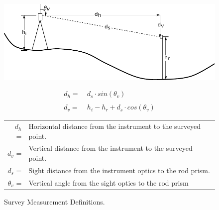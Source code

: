 \begin{figure}[htbp]
	\centering
	\includegraphics[scale=1]{Figures/LineDiagram/SurveyMeasurements}

\begin{align}
	d_h=&\:d_s \cdot sin(\theta_v) \label{eq:horizontal} \\
	\nonumber \\
	d_v=&\:h_i-h_r+d_s \cdot cos(\theta_v) \label{eq:vertical}
\end{align}
\begin{tabular}{r l}
	        $d_h$ = & Horizontal distance from the instrument to the surveyed point.                    \\
	        $d_v$ = & Vertical distance from the instrument to the surveyed point.                      \\
	        $d_s$ = & Sight distance from the instrument optics to the rod prism.                       \\
	   $\theta_v$ = & Vertical angle from the sight optics to the rod prism                             \\
\end{tabular}
	\caption[Survey Measurement Definitions.]{Survey Measurement Definitions.}
	\label{fig:SurveyMeasurements}
\end{figure}

